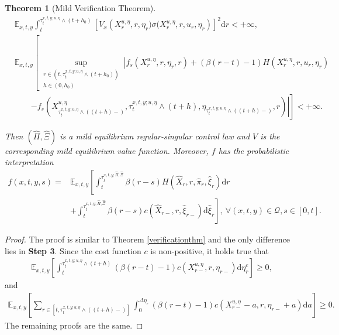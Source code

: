 \documentclass[11pt,reqno]{article}%
\newtheorem{theorem}{Theorem}[section]
\numberwithin{equation}{section}
\begin{document}
\begin{theorem}[Mild Verification Theorem]
\begin{align}
&\mathbb{E}_{x,t,y}\int_{t}^{\tau^{x,t,y;u,\eta}_{t}\wedge(t+h_0)}\left[V_{x}\left(X^{u,\eta}_{r},r,\eta_{r})\sigma(X^{u,\eta}_{r},r,u_r,\eta_{r}\right)\right]^{2}\mathrm{d}r<+\infty,\nonumber\\
&\mathbb{E}_{x,t,y}\left[\sup\limits_{\substack{r\in(t,\tau^{x,t,y;u,\eta}_{t}\wedge(t+h_{0}))\\ h\in(0,h_{0})}}\left|f_s\left(X^{u,\eta}_{r},r,\eta_{r},r\right)+(\beta(r-t)-1) H\left(X^{u,\eta}_r, r,u_r, \eta_r \right)\right.\right.\nonumber\\
&\quad\quad\left.\left.-f_s\left(X^{u,\eta}_{\tau^{x,t,y;u,\eta}_{t}\wedge((t+h)-)},\tau^{x,t,y;u,\eta}_{t}\wedge(t+h),\eta_{\tau^{x,t,y;u,\eta}_{t}\wedge((t+h)-)},r\right)\right|\right]<+\infty.\nonumber
\end{align}

Then $\left(\hat{\Pi},\hat{\Xi}\right)$ is a mild equilibrium regular-singular control law and $V$ is the corresponding mild equilibrium value function. Moreover, $f$ has the probabilistic interpretation
\begin{equation}
\begin{aligned}
\nonumber
f(x,t,y,s)=&\mathbb{E}_{x,t,y}\left[\int_t^{\tau^{x,t,y;\hat{\Pi},\hat{\Xi}}_{t}} \beta(r-s) H\left(\hat{X}_r, r, \hat\pi_r, \hat{\xi}_r \right) \mathrm{d} r\right. \\
& \left.+\int_t^{\tau^{x,t,y;\hat{\Pi},\hat{\Xi}}_{t}} \beta(r-s) c\left(\hat{X}_{r-}, r, \hat{\xi}_{r-}\right) \mathrm{d} \hat{\xi}_r \right],\ \forall (x,t,y)\in\mathcal{Q}, s\in[0,t].
\end{aligned}
\end{equation}
\end{theorem}

\begin{proof}
The proof is similar to Theorem \ref{verificationthm} and the only difference lies in {\bf Step 3}. Since the cost function $c$ is non-positive, it holds true that 
\begin{equation}
\begin{aligned}
\nonumber
\mathbb{E}_{x,t,y}\left[\int_{t}^{\tau^{x,t,y;u,\eta}_{t}\wedge(t+h)}\left(\beta(r-t)-1\right) c\left(X^{u,\eta}_{r-}, r, \eta_{r-}\right) \mathrm{d}\eta^{c}_r\right]\ge 0,
\end{aligned}
\end{equation}
and 
\begin{equation}
\begin{aligned}
\nonumber
\mathbb{E}_{x,t,y}\left[\sum\limits_{r\in[t,\tau^{x,t,y;u,\eta}_{t}\wedge((t+h)-)]}\int_{0}^{\Delta\eta_{r}}\left(\beta(r-t)-1\right) c\left(X^{u,\eta}_{r-}-a, r, \eta_{r-}+a\right)\mathrm{d}a\right]\ge 0.
\end{aligned}
\end{equation}
The remaining proofs are the same.
\end{proof}
\end{document}
